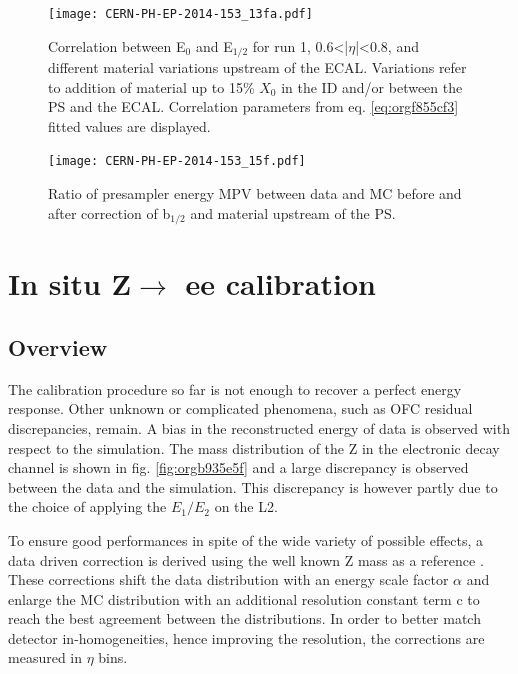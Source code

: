 \begin{figure}[htbp]
\centering
\texttt{[image: CERN-PH-EP-2014-153\_13fa.pdf]}
\caption{\label{fig:orgb8e95bb}
Correlation between E\(_{\text{0}}\) and E\(_{\text{1/2}}\) for run 1, 0.6<|$\eta$|<0.8, and different material variations upstream of the ECAL. Variations refer to addition of material up to 15\% $X_0$ in the ID and/or between the PS and the ECAL. Correlation parameters from eq. \ref{eq:orgf855cf3} fitted values are displayed. \cite{CERN-PH-EP-2014-153}}
\end{figure}


\begin{figure}[htbp]
\centering
\texttt{[image: CERN-PH-EP-2014-153\_15f.pdf]}
\caption{\label{fig:org73e96b5}
Ratio of presampler energy MPV between data and MC before and after correction of b\(_{\text{1/2}}\) and material upstream of the PS. \cite{CERN-PH-EP-2014-153}}
\end{figure}


\section{In situ Z\(\rightarrow\) ee calibration}
\label{sec:org48e1333}
\label{sec:Calibration_inSituZee}

\subsection{Overview}
\label{sec:org5e89c11}

The calibration procedure so far is not enough to recover a perfect energy response.
Other unknown or complicated phenomena, such as OFC residual discrepancies, remain.
A bias in the reconstructed energy of data is observed with respect to the simulation.
The mass distribution of the Z in the electronic decay channel is shown in fig. \ref{fig:orgb935e5f} and a large discrepancy is observed between the data and the simulation.
This discrepancy is however partly due to the choice of applying the $E_1/E_2$ on the L2.

To ensure good performances in spite of the wide variety of possible effects, a data driven correction is derived  using the well known Z mass \cite{PDG2016} as a reference \cite{ATL-LARG-2004-008,ATL-COM-PHYS-2013-1653}.
These corrections shift the data distribution with an energy scale factor \(\alpha\) and enlarge the MC distribution with an additional resolution constant term c to reach the best agreement between the distributions.
In order to better match detector in-homogeneities, hence improving the resolution, the corrections are measured in $\eta$ bins.


